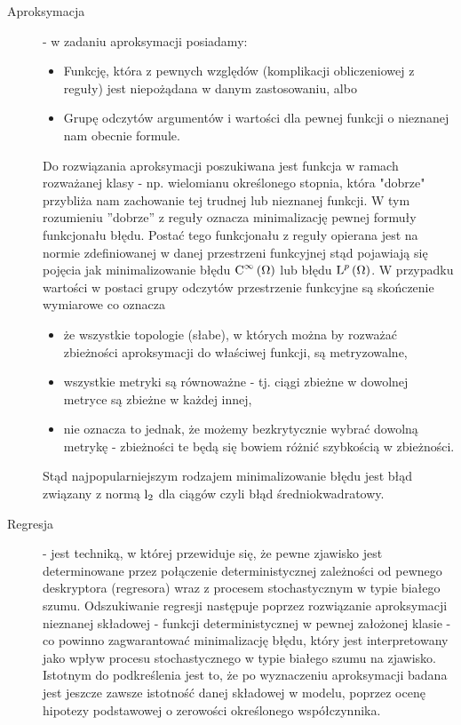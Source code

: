 \documentclass[10pt,a4paper]{book}
\begin{document}
\begin{description}
\item[Aproksymacja]  - w zadaniu aproksymacji posiadamy: 
\begin{itemize}
\item Funkcję, która z pewnych względów (komplikacji obliczeniowej z reguły) jest niepożądana w danym zastosowaniu, albo
\item Grupę odczytów argumentów i wartości dla pewnej funkcji o nieznanej nam obecnie formule.
\end{itemize}
Do rozwiązania aproksymacji poszukiwana jest funkcja w ramach rozważanej klasy - np. wielomianu określonego stopnia, która "dobrze" przybliża nam zachowanie tej trudnej lub nieznanej funkcji. W tym rozumieniu ''dobrze'' z reguły oznacza minimalizację pewnej formuły funkcjonału błędu. Postać tego funkcjonału z reguły opierana jest na normie zdefiniowanej w danej przestrzeni funkcyjnej stąd pojawiają się pojęcia jak minimalizowanie błędu $\Ck{\infty}{\Omega} $ lub błędu $\Lp{p}{\Omega}$. W przypadku wartości w postaci grupy odczytów przestrzenie funkcyjne są skończenie wymiarowe co oznacza
\begin{itemize}
\item że wszystkie topologie (słabe), w których można by rozważać zbieżności aproksymacji do właściwej funkcji, są metryzowalne,
\item wszystkie metryki są równoważne - tj. ciągi zbieżne w dowolnej metryce są zbieżne w każdej innej,
\item nie oznacza to jednak, że możemy bezkrytycznie wybrać dowolną metrykę - zbieżności te będą się bowiem różnić szybkością w zbieżności.
\end{itemize}
Stąd najpopularniejszym rodzajem minimalizowanie błędu jest błąd związany z normą $\operatorname{l}_{2}$ dla ciągów czyli błąd średniokwadratowy.
\item[Regresja] - jest techniką, w której przewiduje się, że pewne zjawisko jest determinowane przez połączenie deterministycznej zależności od pewnego deskryptora (regresora) wraz z procesem stochastycznym w typie białego szumu. Odszukiwanie regresji następuje poprzez rozwiązanie aproksymacji nieznanej składowej - funkcji deterministycznej w pewnej założonej klasie - co powinno zagwarantować minimalizację błędu, który jest interpretowany jako wpływ procesu stochastycznego w typie białego szumu na zjawisko. Istotnym do podkreślenia jest to, że po wyznaczeniu aproksymacji badana jest jeszcze zawsze istotność danej składowej w modelu, poprzez ocenę hipotezy podstawowej o zerowości określonego współczynnika.
\end{description}
\end{document}
